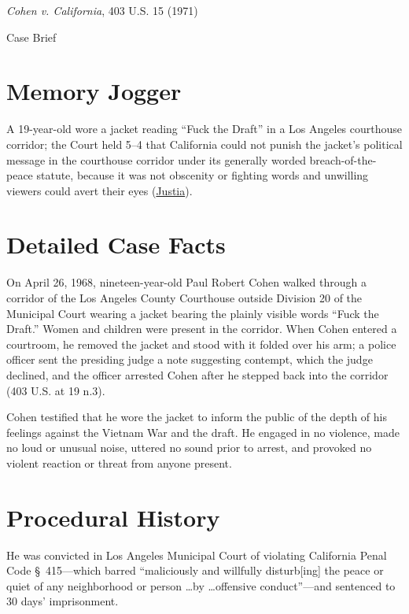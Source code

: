 \documentclass[12pt]{article}
\begin{document}
\begin{center}
{\LARGE \textit{Cohen v. California}, 403 U.S. 15 (1971)\par}
\vspace{0.8em}
{\large Case Brief\par}
\end{center}
\vspace{1em}

\section{Memory Jogger}
A 19-year-old wore a jacket reading ``Fuck the Draft'' in a Los Angeles courthouse corridor; the Court held 5--4 that California could not punish the jacket's political message in the courthouse corridor under its generally worded breach-of-the-peace statute, because it was not obscenity or fighting words and unwilling viewers could avert their eyes (\href{https://supreme.justia.com/cases/federal/us/403/15/}{Justia}).

\section{Detailed Case Facts}
On April 26, 1968, nineteen-year-old Paul Robert Cohen walked through a corridor of the Los Angeles County Courthouse outside Division 20 of the Municipal Court wearing a jacket bearing the plainly visible words ``Fuck the Draft.'' Women and children were present in the corridor. When Cohen entered a courtroom, he removed the jacket and stood with it folded over his arm; a police officer sent the presiding judge a note suggesting contempt, which the judge declined, and the officer arrested Cohen after he stepped back into the corridor (403 U.S. at 19 n.3).

Cohen testified that he wore the jacket to inform the public of the depth of his feelings against the Vietnam War and the draft. He engaged in no violence, made no loud or unusual noise, uttered no sound prior to arrest, and provoked no violent reaction or threat from anyone present.

\section{Procedural History}
He was convicted in Los Angeles Municipal Court of violating California Penal Code \S~415---which barred ``maliciously and willfully disturb[ing] the peace or quiet of any neighborhood or person \dots by \dots offensive conduct''---and sentenced to 30 days' imprisonment.
\end{document}
